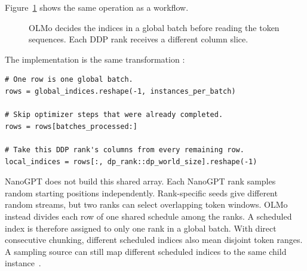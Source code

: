 \documentclass[11pt]{article}
\begin{document}
Figure~\ref{fig:olmo-index-workflow} shows the same operation as a workflow.

\begin{figure}[ht]
\centering
{}
\caption{OLMo decides the indices in a global batch before reading the token
sequences. Each DDP rank receives a different column slice.}
\label{fig:olmo-index-workflow}
\end{figure}

The implementation is the same transformation
\cite{olmo-composable-loader}:

\begin{lstlisting}[basicstyle=\ttfamily\footnotesize]
# One row is one global batch.
rows = global_indices.reshape(-1, instances_per_batch)

# Skip optimizer steps that were already completed.
rows = rows[batches_processed:]

# Take this DDP rank's columns from every remaining row.
local_indices = rows[:, dp_rank::dp_world_size].reshape(-1)
\end{lstlisting}

NanoGPT does not build this shared array. Each NanoGPT rank samples random
starting positions independently. Rank-specific seeds give different random
streams, but two ranks can select overlapping token windows. OLMo instead
divides each row of one shared schedule among the ranks. A scheduled index is
therefore assigned to only one rank in a global batch. With direct consecutive
chunking, different scheduled indices also mean disjoint token ranges. A
sampling source can still map different scheduled indices to the same child
instance~\cite{olmo-sampling-instance-source}.
\end{document}
